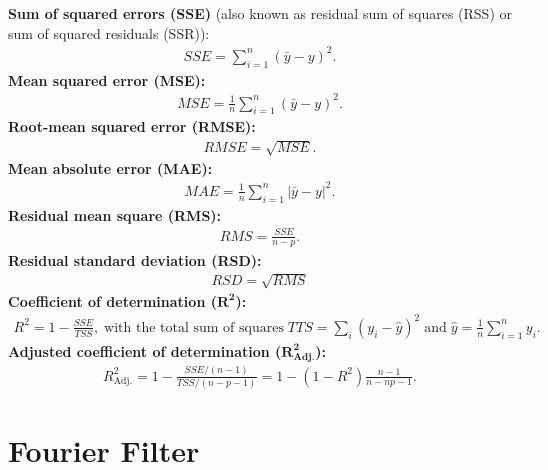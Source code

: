 \textbf{Sum of squared errors (SSE)} (also known as residual sum of squares (RSS) or sum of squared residuals (SSR)):
\begin{eqnarray*}
SSE = \sum_{i=1}^n (\bar y -y)^2.
\end{eqnarray*}
\textbf{Mean squared error (MSE):}
\begin{eqnarray*}
MSE = \frac{1}{n} \sum_{i=1}^n (\bar y -y)^2.
\end{eqnarray*}
\textbf{Root-mean squared error (RMSE):}
\begin{eqnarray*}
RMSE = \sqrt{MSE}.
\end{eqnarray*}
\textbf{Mean absolute error (MAE):}
\begin{eqnarray*}
MAE = \frac{1}{n} \sum_{i=1}^n |\bar y -y|^2.
\end{eqnarray*}
\textbf{Residual mean square (RMS):}
\begin{eqnarray*}
RMS = \frac{SSE}{n-p}.
\end{eqnarray*}
\textbf{Residual standard deviation (RSD):}
\begin{eqnarray*}
RSD = \sqrt{RMS}
\end{eqnarray*}
\textbf{Coefficient of determination ($\mathbf{R^2}$):}
\begin{eqnarray*}
R^2 = 1 - \frac{SSE}{TSS},\; \text{with the total sum of squares}\; TTS = \sum_i (y_i - \hat y)^2\; \text{and}\; \hat y = \frac 1n \sum_{i=1}^n y_i.
\end{eqnarray*}
\textbf{Adjusted coefficient of determination (}$\mathbf{R^2_{Adj.}}$\textbf{):}
\begin{eqnarray*}
R^2_{\mathrm{Adj.}} = 1 - \frac{SSE/(n-1)}{TSS/(n-p-1)} =  1 - (1-R^2) \frac{n-1}{n-np-1}.
\end{eqnarray*}

\section{Fourier Filter}\label{sec:fourier_filter}

\newpage
